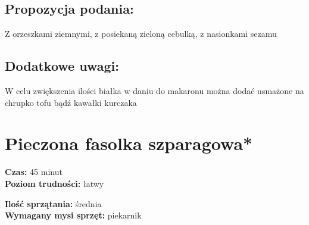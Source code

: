 \documentclass[a4paper,10pt]{book}
\begin{document}
\vspace{0.5cm}

\small \section*{Propozycja podania:} Z orzeszkami ziemnymi, z posiekaną zieloną cebulką, z nasionkami sezamu

\vspace{0.3cm}

\section*{Dodatkowe uwagi:} W celu zwiększenia ilości białka w daniu do makaronu można dodać usmażone na chrupko tofu bądź kawałki kurczaka

\chapter{Pieczona fasolka szparagowa*}

\vspace{0.1cm}
\small
\begin{minipage}{0.45\textwidth}
    \noindent \textbf{Czas:} 45 minut \\
    \textbf{Poziom trudności:} łatwy
\end{minipage}
\begin{minipage}{0.45\textwidth}
    \noindent \textbf{Ilość sprzątania:} średnia\\
    \textbf{Wymagany mysi sprzęt:} piekarnik
\end{minipage}
\normalsize
\vspace{0.5cm}
\end{document}

